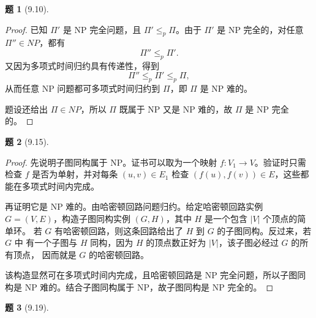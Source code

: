 \documentclass[11pt, a4paper]{article}
\newtheorem{problem}{题}
\begin{document}
\vspace{1em}

\begin{problem}[9.10]
\end{problem}

\begin{proof}
    已知 $\Pi'$ 是 NP 完全问题，且 $\Pi'\le_p \Pi$。由于 $\Pi'$ 是 NP 完全的，对任意
    $\Pi''\in NP$，都有
    \[
        \Pi''\le_p \Pi'.
    \]
    又因为多项式时间归约具有传递性，得到
    \[
        \Pi''\le_p \Pi'\le_p \Pi,
    \]
    从而任意 NP 问题都可多项式时间归约到 $\Pi$，即 $\Pi$ 是 NP 难的。

    题设还给出 $\Pi\in NP$，所以 $\Pi$ 既属于 NP 又是 NP 难的，故 $\Pi$ 是 NP 完全的。
\end{proof}

\vspace{1em}

\begin{problem}[9.15]
\end{problem}

\begin{proof}
    先说明子图同构属于 NP。证书可以取为一个映射
    $f:V_1\to V$。验证时只需检查 $f$ 是否为单射，并对每条
    $(u,v)\in E_1$ 检查 $(f(u),f(v))\in E$，这些都能在多项式时间内完成。

    再证明它是 NP 难的。由哈密顿回路问题归约。给定哈密顿回路实例
    $G=(V,E)$，构造子图同构实例 $(G,H)$，其中 $H$ 是一个包含 $|V|$ 个顶点的简单环。
    若 $G$ 有哈密顿回路，则这条回路给出了 $H$ 到 $G$ 的子图同构。反过来，若 $G$ 中
    有一个子图与 $H$ 同构，因为 $H$ 的顶点数正好为 $|V|$，该子图必经过 $G$ 的所有顶点，
    因而就是 $G$ 的哈密顿回路。

    该构造显然可在多项式时间内完成，且哈密顿回路是 NP 完全问题，所以子图同构是
    NP 难的。结合子图同构属于 NP，故子图同构是 NP 完全的。
\end{proof}

\vspace{1em}

\begin{problem}[9.19]
\end{problem}
\end{document}
